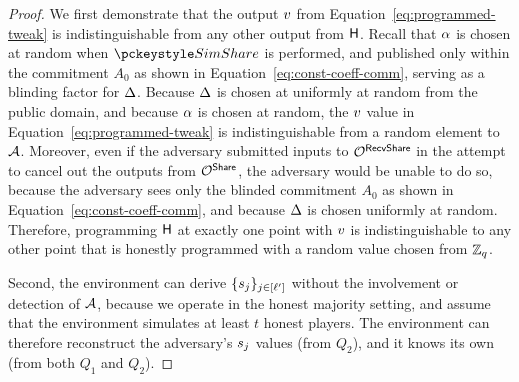\begin{proof}
  We first demonstrate that the output $v$ from Equation~\ref{eq:programmed-tweak} is indistinguishable from any other output from $\mathsf{H}$.
  Recall that $\alpha$ is chosen at random when $\simshare$ is performed,
  and published only within the commitment $A_0$ as shown in Equation~\ref{eq:const-coeff-comm},
  serving as a blinding factor for $\Delta$.
  Because $\Delta$ is chosen at uniformly at random from the public domain,
  and because $\alpha$ is chosen at random,
  the $v$ value in Equation~\ref{eq:programmed-tweak} is indistinguishable from a random element to $\mathcal{A}$.
%
  Moreover, even if the adversary submitted inputs to $\mathcal{O}^{\mathsf{RecvShare}}$ in the attempt to cancel out the outputs from $\mathcal{O}^{\mathsf{Share}}$, the adversary would be unable to do so,
  because the adversary sees only the blinded commitment $A_0$ as shown in Equation~\ref{eq:const-coeff-comm},
  and because $\Delta$ is chosen uniformly at random.
  Therefore, programming $\mathsf{H}$ at exactly one point with $v$ is indistinguishable to any other point that is honestly programmed with a random value chosen from $\mathbb{Z}_q$.

  Second, the environment can derive $\{ s_j \}_{ j \in [{\mathsf{\ell}'}]}$ without the involvement or detection of $\mathcal{A}$,
  because we operate in the honest majority setting, and assume that the environment simulates at least $t$ honest players. The environment can therefore reconstruct the adversary's $s_j$ values (from $Q_2$), and it knows its own (from both $Q_1$ and $Q_2$).


\end{proof}
